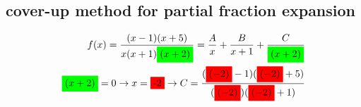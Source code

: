\subsection{cover-up method for partial fraction expansion}
    \begin{align*}
        f(x) = \frac{(x-1)(x+5)}{x(x+1)\colorbox{green}{$(x+2)$}} = \frac{A}{x} + \frac{B}{x+1} + \frac{C}{\colorbox{green}{$(x+2)$}}\\
        \colorbox{green}{$(x+2)$} = 0 \rightarrow x = \colorbox{red}{-2} \rightarrow C = \frac{(\colorbox{red}{$(-2)$}-1)(\colorbox{red}{$(-2)$}+5)}{(\colorbox{red}{$(-2)$})(\colorbox{red}{$(-2)$}+1)}
    \end{align*}
